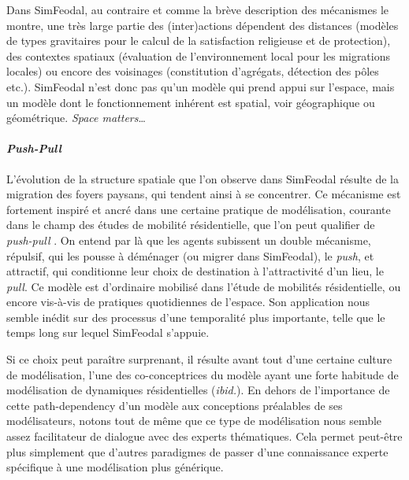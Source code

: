Dans SimFeodal, au contraire et comme la brève description des mécanismes le montre, une très large partie des (inter)actions dépendent des distances (modèles de types gravitaires pour le calcul de la satisfaction religieuse et de protection), des contextes spatiaux (évaluation de l'environnement local pour les migrations locales) ou encore des voisinages (constitution d'agrégats, détection des pôles etc.).
SimFeodal n'est donc pas qu'un modèle qui prend appui sur l'espace, mais un modèle dont le fonctionnement inhérent est spatial, voir géographique ou géométrique.
\textit{Space matters}\ldots

\paragraph{\textit{Push-Pull}}

L'évolution de la structure spatiale que l'on observe dans SimFeodal résulte de la migration des foyers paysans, qui tendent ainsi à se concentrer.
Ce mécanisme est fortement inspiré et ancré dans une certaine pratique de modélisation, courante dans le champ des études de mobilité résidentielle, que l'on peut qualifier de \og \textit{push-pull}\fg{} \autocite{tannier_analyse_2017}.
On entend par là que les agents subissent un double mécanisme, répulsif, qui les pousse à déménager (ou migrer dans SimFeodal), le \textit{push}, et attractif, qui conditionne leur choix de destination à l'attractivité d'un lieu, le \textit{pull}.
Ce modèle est d'ordinaire mobilisé dans l'étude de mobilités résidentielle, ou encore vis-à-vis de pratiques quotidiennes de l'espace.
Son application nous semble inédit sur des processus d'une temporalité plus importante, telle que le temps long sur lequel SimFeodal s'appuie.

Si ce choix peut paraître surprenant, il résulte avant tout d'une certaine \og culture de modélisation\fg{}, l'une des co-conceptrices du modèle ayant une forte habitude de modélisation de dynamiques résidentielles (\textit{ibid.}).
En dehors de l'importance de cette \og path-dependency\fg{} d'un modèle aux conceptions préalables de ses modélisateurs, notons tout de même que ce type de modélisation nous semble assez facilitateur de dialogue avec des experts thématiques.
Cela permet peut-être plus simplement que d'autres paradigmes de passer d'une connaissance experte spécifique à une modélisation plus générique.

